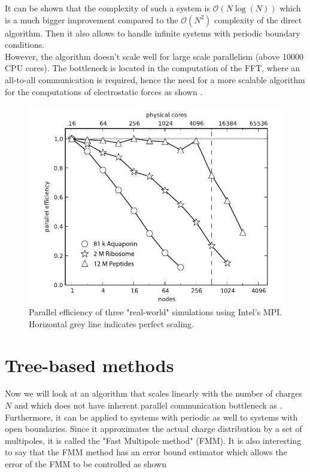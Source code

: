 \documentclass[11pt,twoside,a4paper]{report}
\begin{document}
It can be shown that the complexity of such a system is $\mathcal{O}(N \log(N))$ which is a much bigger improvement compared to the $\mathcal{O}(N^2)$ complexity of the direct algorithm. Then it also allows to handle infinite systems with periodic boundary conditions.\\ However, the algorithm doesn't scale well for large scale parallelism (above 10000 CPU cores)\cite{kutzner2013scaling}. The bottleneck is located in the computation of the FFT, where an all-to-all communication is required, hence the need for a more scalable algorithm for the computations of electrostatic forces as shown \cite{kutzner2013scaling}.

\begin{figure}[H]
\includegraphics[scale=0.6]{scalingMUC}
 \centering 
\caption{ Parallel efficiency of three "real-world" simulations using Intel's MPI. Horizontal grey line indicates perfect scaling.}
\label{fig:scaling}
\end{figure}



\section{Tree-based methods}

Now we will look at an algorithm that scales linearly with the number of charges $N$ and which does not have inherent parallel communication bottleneck as \cite{kutzner2013scaling}.
Furthermore, it can be applied to systems with periodic as well to systems with open boundaries. Since it approximates the actual charge distribution by a set of multipoles, it is called the "Fast Multipole method" (FMM). It is also interesting to say that the FMM method has an error bound estimator which allows the error of the FMM to be controlled as shown \cite{dachsel2010corrected}
    
\end{document}
